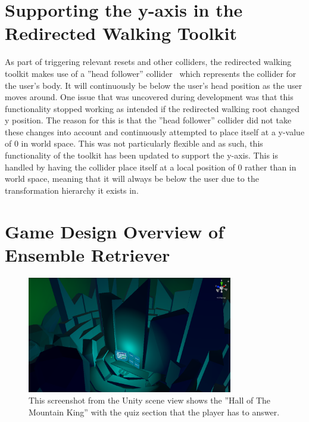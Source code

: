 \section{Supporting the y-axis in the Redirected Walking Toolkit}
As part of triggering relevant resets and other colliders, the redirected walking toolkit makes use of a ''head follower'' collider~\cite{headFollower} which represents the collider for the user's body. It will continuously be below the user's head position as the user moves around. One issue that was uncovered during development was that this functionality stopped working as intended if the redirected walking root changed y position. The reason for this is that the ''head follower'' collider did not take these changes into account and continuously attempted to place itself at a y-value of 0 in world space. This was not particularly flexible and as such, this functionality of the toolkit has been updated to support the y-axis. This is handled by having the collider place itself at a local position of 0 rather than in world space, meaning that it will always be below the user due to the transformation hierarchy it exists in. 

\section{Game Design Overview of Ensemble Retriever} 
\begin{figure}[tbph]
    \centering
    \includegraphics[width=0.8\textwidth]{figures/screenshots/HallOfTheMountainKingKindaLowRes.png}
    \caption[Screenshot of the ''Hall of The Mountain King'']{This screenshot from the Unity scene view shows the ''Hall of The Mountain King'' with the quiz section that the player has to answer.}
    \label{fig:mkhallWithWall}
\end{figure}

